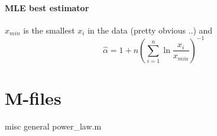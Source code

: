 \documentclass[a4paper,titlepage] {scrartcl}
\begin{document}
\paragraph{MLE best estimator} %
\label{par:mle_best_estimator}
$\hat x_{min}$ is the smallest $x_i$ in the data (pretty obvious ..) and
\begin{equation}
	\hat \alpha = 1 + n\left(\sum_{i=1}^n\ln{\frac{x_i}{x_{min}}}\right)^{-1}
\end{equation}


\section{M-files} %
\label{sec:m_files}
misc general \/ power\_law.m
\end{document}
